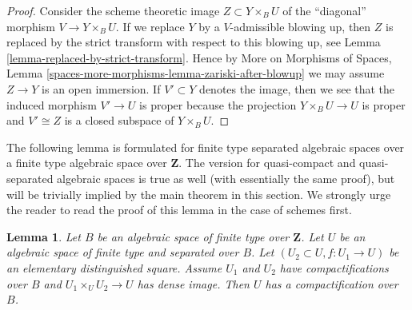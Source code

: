 \documentclass{stacks-project}
\theoremstyle{plain}
\newtheorem{lemma}[subsection]{Lemma}
\theoremstyle{definition}
\theoremstyle{remark}
\numberwithin{equation}{subsection}
\begin{document}
\begin{proof}
Consider the scheme theoretic image $Z \subset Y \times_B U$
of the ``diagonal'' morphism $V \to Y \times_B U$. If we replace
$Y$ by a $V$-admissible blowing up, then $Z$ is replaced by
the strict transform with respect to this blowing up, see
Lemma \ref{lemma-replaced-by-strict-transform}. Hence by
More on Morphisms of Spaces, Lemma
\ref{spaces-more-morphisms-lemma-zariski-after-blowup}
we may assume $Z \to Y$
is an open immersion. If $V' \subset Y$ denotes the image, then we
see that the induced morphism $V' \to U$ is proper because the
projection $Y \times_B U \to U$ is proper and $V' \cong Z$
is a closed subspace of $Y \times_B U$.
\end{proof}

\noindent
The following lemma is formulated for finite type separated algebraic spaces
over a finite type algebraic space over $\mathbf{Z}$. The version for
quasi-compact and quasi-separated algebraic spaces is true as well (with
essentially the same proof), but will be trivially
implied by the main theorem in this section. We strongly urge the
reader to read the proof of this lemma in the case of schemes first.

\begin{lemma}
\label{lemma-two-compactifications}
Let $B$ be an algebraic space of finite type over $\mathbf{Z}$.
Let $U$ be an algebraic space of finite type and separated over $B$.
Let $(U_2 \subset U, f : U_1 \to U)$ be an
elementary distinguished square. Assume $U_1$ and $U_2$ have
compactifications over $B$ and $U_1 \times_U U_2 \to U$ has dense image.
Then $U$ has a compactification over $B$.
\end{lemma}
\end{document}

